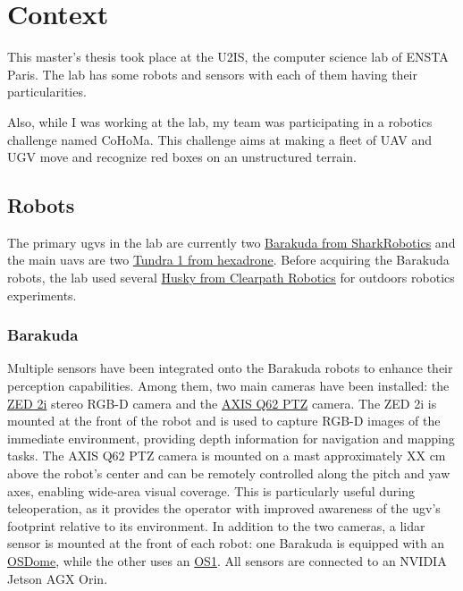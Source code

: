 \chapter{Context}

This master's thesis took place at the U2IS, the computer science lab of ENSTA Paris.
The lab has some robots and sensors with each of them having their particularities.

Also, while I was working at the lab, my team was participating in a robotics challenge named CoHoMa.
This challenge aims at making a fleet of UAV and UGV move and recognize red boxes on an unstructured terrain.


\section{Robots}

The primary \gls{ugv}s in the lab are currently two \href{https://www.shark-robotics.com/robots/barakuda-mule-robot}{Barakuda from SharkRobotics}
and the main \gls{uav}s are two \href{https://www.hexadrone.fr/produits/drone-tundra/}{Tundra 1 from hexadrone}.
Before acquiring the Barakuda robots, the lab used several
\href{https://clearpathrobotics.com/husky-a300-unmanned-ground-vehicle-robot/}{Husky from Clearpath Robotics} for
outdoors robotics experiments.

\subsection{Barakuda}


Multiple sensors have been integrated onto the Barakuda robots to enhance their perception capabilities.
Among them, two main cameras have been installed: the \href{https://www.stereolabs.com/en-fr/products/zed-2}{ZED 2i} stereo RGB-D camera and the \href{https://www.axis.com/products/axis-q62-series}{AXIS Q62 PTZ} camera.
The ZED 2i is mounted at the front of the robot and is used to capture RGB-D images of the immediate environment, providing depth information for navigation and mapping tasks.
The AXIS Q62 PTZ camera is mounted on a mast approximately XX cm above the robot's center and can be remotely controlled along the pitch and yaw axes, enabling wide-area visual coverage. %
This is particularly useful during teleoperation, as it provides the operator with improved awareness of the \gls{ugv}'s footprint relative to its environment.
In addition to the two cameras, a \gls{lidar} sensor is mounted at the front of each robot: one Barakuda is equipped with an \href{https://ouster.com/products/hardware/osdome-lidar-sensor}{OSDome}, while the other uses an \href{https://ouster.com/products/hardware/os1-lidar-sensor}{OS1}.
All sensors are connected to an NVIDIA Jetson AGX Orin.

